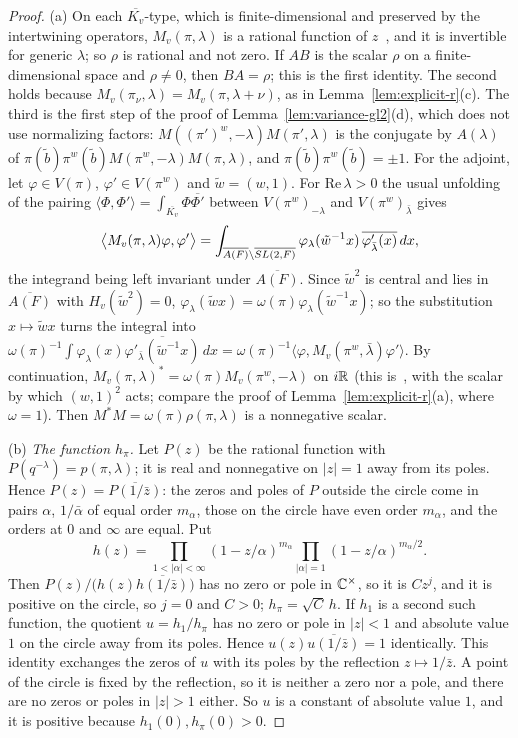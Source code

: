 \begin{proof}
(a) On each $\overline{K_v}$-type, which is finite-dimensional and
preserved by the intertwining operators, $M_v(\pi,\lambda)$ is a rational
function of $z$~\cite{Li12a}, and it is invertible for generic $\lambda$;
so $\rho$ is rational and not zero. If $AB$ is the scalar $\rho$ on a
finite-dimensional space and $\rho\ne0$, then $BA=\rho$; this is the
first identity. The second holds because $M_v(\pi_\nu,\lambda)=M_v(\pi,
\lambda+\nu)$, as in Lemma~\ref{lem:explicit-r}(c). The third is the
first step of the proof of Lemma~\ref{lem:variance-gl2}(d), which does
not use normalizing factors: $M((\pi')^w,-\lambda)M(\pi',\lambda)$ is the
conjugate by $A(\lambda)$ of $\pi(\tilde b)\pi^w(\tilde b)M(\pi^w,
-\lambda)M(\pi,\lambda)$, and $\pi(\tilde b)\pi^w(\tilde b)=\pm1$. For
the adjoint, let $\varphi\in V(\pi)$, $\varphi'\in V(\pi^w)$ and
$\tilde w=(w,1)$. For $\mathrm{Re}\,\lambda>0$ the usual unfolding of the
pairing $\langle\Phi,\Phi'\rangle=\int_{\overline{K_v}}\Phi\overline{\Phi'}$
between $V(\pi^w)_{-\lambda}$ and $V(\pi^w)_{\bar\lambda}$ gives
\[
\bigl\langle M_v(\pi,\lambda)\varphi,\varphi'\bigr\rangle=
\int_{\overline{A(F)}\backslash\overline{SL(2,F)}}\varphi_\lambda(\tilde w^{-1}x)\,
\overline{\varphi'_{\bar\lambda}(x)}\,dx,
\]
the integrand being left invariant under $\overline{A(F)}$. Since
$\tilde w^2$ is central and lies in $\overline{A(F)}$ with $H_v(\tilde
w^2)=0$, $\varphi_\lambda(\tilde wx)=\omega(\pi)\varphi_\lambda(\tilde
w^{-1}x)$; so the substitution $x\mapsto\tilde wx$ turns the integral into
$\omega(\pi)^{-1}\int\varphi_\lambda(x)\overline{\varphi'_{\bar\lambda}
(\tilde w^{-1}x)}\,dx=\omega(\pi)^{-1}\langle\varphi,M_v(\pi^w,\bar\lambda)
\varphi'\rangle$. By continuation, $M_v(\pi,\lambda)^*=\omega(\pi)M_v
(\pi^w,-\lambda)$ on $i\mathbb{R}$ (this is~\cite[\S1]{Ar89}, with the scalar by
which $(w,1)^2$ acts; compare the proof of
Lemma~\ref{lem:explicit-r}(a), where $\omega=1$). Then
$M^*M=\omega(\pi)\rho(\pi,\lambda)$ is a nonnegative scalar.

(b) \emph{The function $h_\pi$.} Let $P(z)$ be the rational function
with $P(q^{-\lambda})=p(\pi,\lambda)$; it is real and nonnegative on
$|z|=1$ away from its poles. Hence $P(z)=\overline{P(1/\bar z)}$: the
zeros and poles of $P$ outside the circle come in pairs $\alpha$,
$1/\bar\alpha$ of equal order $m_\alpha$, those on the circle have even
order $m_\alpha$, and the orders at $0$ and $\infty$ are equal. Put
\[
h(z)=\prod_{1<|\alpha|<\infty}(1-z/\alpha)^{m_\alpha}\prod_{|\alpha|=1}
(1-z/\alpha)^{m_\alpha/2}.
\]
Then $P(z)/\bigl(h(z)\overline{h(1/\bar z)}\bigr)$ has no zero or pole in
$\mathbb{C}^\times$, so it is $Cz^j$, and it is positive on the circle, so $j=0$
and $C>0$; $h_\pi=\sqrt C\,h$. If $h_1$ is a second such function,
the quotient $u=h_1/h_\pi$ has no zero or pole in $|z|<1$ and absolute
value $1$ on the circle away from its poles. Hence
$u(z)\overline{u(1/\bar z)}=1$ identically. This identity exchanges the
zeros of $u$ with its poles by the reflection $z\mapsto1/\bar z$. A point
of the circle is fixed by the reflection, so it is neither a zero nor a
pole, and there are no zeros or poles in $|z|>1$ either. So $u$ is a
constant of absolute value $1$, and it is positive because
$h_1(0),h_\pi(0)>0$.


\end{proof}
